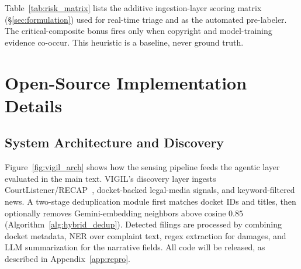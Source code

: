 Table~\ref{tab:risk_matrix} lists the additive ingestion-layer scoring matrix (\S\ref{sec:formulation}) used for real-time triage and as the automated pre-labeler. The critical-composite bonus fires only when copyright and model-training evidence co-occur. This heuristic is a baseline, never ground truth.

\begin{table}[h]
\centering
\caption{Ingestion-layer scoring matrix. The critical-composite bonus fires only when copyright and model-training evidence co-occur.}
\label{tab:risk_matrix}
\small
\setlength{\tabcolsep}{3.5pt}
\end{table}

\section{Open-Source Implementation Details}
\label{app:impl}

\subsection{System Architecture and Discovery}

Figure~\ref{fig:vigil_arch} shows how the sensing pipeline feeds the agentic layer evaluated in the main text. VIGIL's discovery layer ingests CourtListener/RECAP~\citep{courtlistener2023}, docket-backed legal-media signals, and keyword-filtered news. A two-stage deduplication module first matches docket IDs and titles, then optionally removes Gemini-embedding neighbors above cosine $0.85$ (Algorithm~\ref{alg:hybrid_dedup}). Detected filings are processed by combining docket metadata, NER over complaint text, regex extraction for damages, and LLM summarization for the narrative fields.
All code will be released, as described in Appendix~\ref{app:repro}.

